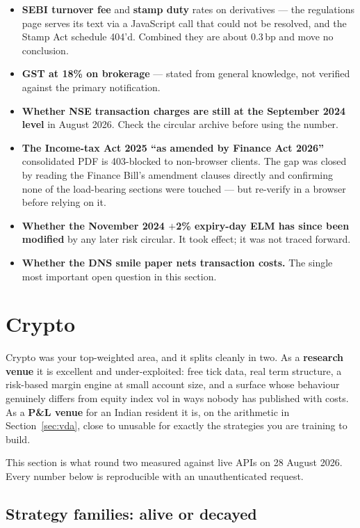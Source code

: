 \documentclass[11pt,a4paper]{article}
\begin{document}
\begin{itemize}
\item \textbf{SEBI turnover fee} and \textbf{stamp duty} rates on derivatives ---
the regulations page serves its text via a JavaScript call that could not be
resolved, and the Stamp Act schedule 404'd. Combined they are about 0.3\,bp and
move no conclusion.
\item \textbf{GST at 18\% on brokerage} --- stated from general knowledge, not
verified against the primary notification.
\item \textbf{Whether NSE transaction charges are still at the September 2024
level} in August 2026. Check the circular archive before using the number.
\item \textbf{The Income-tax Act 2025 ``as amended by Finance Act 2026''}
consolidated PDF is 403-blocked to non-browser clients. The gap was closed by
reading the Finance Bill's amendment clauses directly and confirming none of the
load-bearing sections were touched --- but re-verify in a browser before relying on it.
\item \textbf{Whether the November 2024 $+$2\% expiry-day ELM has since been
modified} by any later risk circular. It took effect; it was not traced forward.
\item \textbf{Whether the DNS smile paper nets transaction costs.} The single most
important open question in this section.
\end{itemize}

\newpage
\section{Crypto}
\label{sec:crypto}

Crypto was your top-weighted area, and it splits cleanly in two. As a
\textbf{research venue} it is excellent and under-exploited: free tick data, real
term structure, a risk-based margin engine at small account size, and a surface
whose behaviour genuinely differs from equity index vol in ways nobody has
published with costs. As a \textbf{P\&L venue} for an Indian resident it is, on
the arithmetic in Section~\ref{sec:vda}, close to unusable for exactly the
strategies you are training to build.

This section is what round two measured against live APIs on 28 August 2026. Every
number below is reproducible with an unauthenticated request.

\subsection{Strategy families: alive or decayed}
\end{document}
